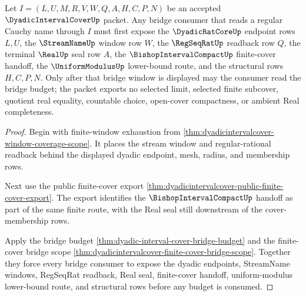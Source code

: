 \begin{theorem}
\label{thm:dyadic-interval-cover-regular-cauchy-window}
Let $I=(L,U,M,R,V,W,Q,A,H,C,P,N)$ be an accepted $\DyadicIntervalCoverUp$ packet. Any bridge consumer that reads a regular Cauchy name through $I$ must first expose the $\DyadicRatCoreUp$ endpoint rows $L,U$, the $\StreamNameUp$ window row $W$, the $\RegSeqRatUp$ readback row $Q$, the terminal $\RealUp$ seal row $A$, the $\BishopIntervalCompactUp$ finite-cover handoff, the $\UniformModulusUp$ lower-bound route, and the structural rows $H,C,P,N$. Only after that bridge window is displayed may the consumer read the bridge budget; the packet exports no selected limit, selected finite subcover, quotient real equality, countable choice, open-cover compactness, or ambient Real completeness.
\end{theorem}
\begin{proof}
Begin with finite-window exhaustion from \autoref{thm:dyadicintervalcover-window-coverage-scope}. It places the stream window and regular-rational readback behind the displayed dyadic endpoint, mesh, radius, and membership rows.

Next use the public finite-cover export \autoref{thm:dyadicintervalcover-public-finite-cover-export}. The export identifies the $\BishopIntervalCompactUp$ handoff as part of the same finite route, with the Real seal still downstream of the cover-membership rows.

Apply the bridge budget \autoref{thm:dyadic-interval-cover-bridge-budget} and the finite-cover bridge scope \autoref{thm:dyadicintervalcover-finite-cover-bridge-scope}. Together they force every bridge consumer to expose the dyadic endpoints, StreamName windows, RegSeqRat readback, Real seal, finite-cover handoff, uniform-modulus lower-bound route, and structural rows before any budget is consumed.
\end{proof}
